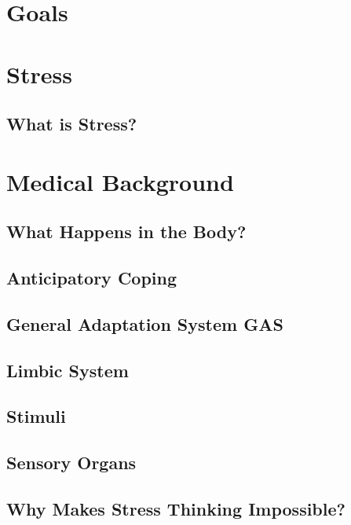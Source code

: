 \documentclass[../main.tex]{subfiles}
\begin{document}
\chapter{Goals}
\chapter{Stress}
\section{What is Stress?}

\chapter{Medical Background}
\section{What Happens in the Body?}

\section{Anticipatory Coping}


\section{General Adaptation System GAS}


\section{Limbic System}

\section{Stimuli}

\section{Sensory Organs}

\section{Why Makes Stress Thinking Impossible?}

\end{document}
